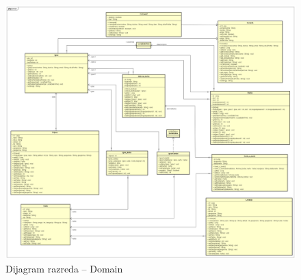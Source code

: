 \begin{itemize}
		\begin{figure}[H]
			\includegraphics[width=\textwidth]{slike/Domain.png}
			\centering
			\caption{Dijagram razreda – Domain}
			\label{fig:promjene}
		\end{figure}


		\eject


\end{itemize}
